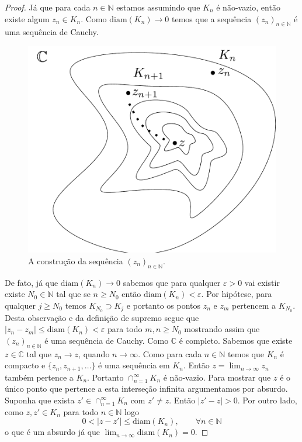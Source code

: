 \begin{proof}
Já que para cada $n\in\mathbb{N}$ estamos assumindo que $K_n$ é não-vazio, então existe algum
$z_n\in K_n$. Como $\mathrm{diam}(K_n)\to 0$ temos que a sequência $(z_n)_{n\in\mathbb{N}}$
é uma sequência de Cauchy. 

\begin{figure}[H]
\centering
\includegraphics[scale=0.6]{Figuras/teorema-cantor}
\caption{A construção da sequência $(z_n)_{n\in\mathbb{N}}$.}
\label{fig:teorema-cantor}
\end{figure}


De fato, já que $\mathrm{diam}(K_n)\to 0$ sabemos que para qualquer $\varepsilon>0$ vai existir existe $N_0\in\mathbb{N}$ tal que se $n\geqslant N_0$ então 
$\mathrm{diam}(K_n)<\varepsilon$. Por hipótese, 
para qualquer $j\geqslant N_{0}$ temos $K_{N_0}\supset K_{j}$
e portanto os pontos $z_n$ e $z_{m}$ pertencem a $K_{N_0}$. 
Desta observação e da definição de supremo segue
que $|z_n-z_m|\leq \mathrm{diam}(K_n)<\varepsilon$
para todo $m,n\geqslant N_0$ mostrando assim que $(z_n)_{n\in\mathbb{N}}$
é uma sequência de Cauchy. Como $\mathbb{C}$ é completo. Sabemos que existe $z\in\mathbb{C}$
tal que $z_n\to z$, quando $n\to\infty$. Como para cada $n\in\mathbb{N}$ temos que $K_n$ é compacto e $\{z_n,z_{n+1},\ldots\}$
é uma sequência em $K_n$. Então $z=\lim_{n\to\infty} z_n$ também pertence a $K_n$.
Portanto $\cap_{n=1}^{\infty}K_n$ é não-vazio. Para mostrar que $z$ é o único ponto 
que pertence a esta interseção infinita argumentamos por absurdo. Suponha que exista $z'\in \cap_{n=1}^{\infty}K_n$ com $z'\neq z$. Então $|z'-z|>0$. Por outro lado, como $z,z'\in K_n$ 
para todo $n\in\mathbb{N}$ logo
\[
0<|z-z'|\leqslant \mathrm{diam}(K_n), \qquad \forall n\in\mathbb{N}
\]
o que é um absurdo já que $\lim_{n\to\infty}\mathrm{diam}(K_n)=0$.
\end{proof}

